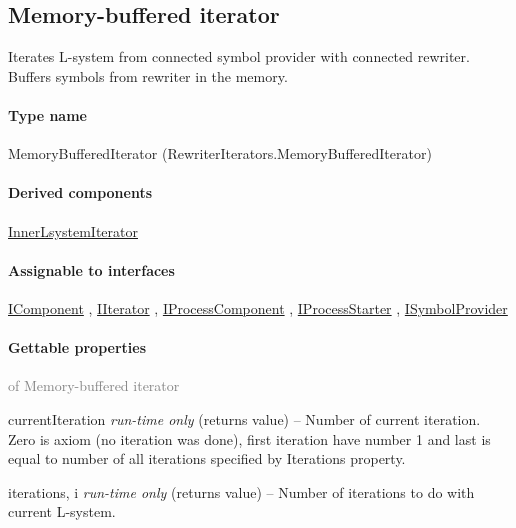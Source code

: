 

\subsection{Memory-buffered iterator}
\label{Malsys.Processing.Components.RewriterIterators.MemoryBufferedIterator}
Iterates L-system from connected symbol provider with connected rewriter.
            Buffers symbols from rewriter in the memory.\paragraph{Type name}
MemoryBufferedIterator (RewriterIterators.MemoryBufferedIterator) 	\paragraph{Derived components}
		\hyperref[Malsys.Processing.Components.RewriterIterators.InnerLsystemIterator]{InnerLsystemIterator}%
	\paragraph{Assignable to interfaces}
		\hyperref[Malsys.Processing.Components.IComponent]{IComponent}%
, 		\hyperref[Malsys.Processing.Components.IIterator]{IIterator}%
, 		\hyperref[Malsys.Processing.Components.IProcessComponent]{IProcessComponent}%
, 		\hyperref[Malsys.Processing.Components.IProcessStarter]{IProcessStarter}%
, 		\hyperref[Malsys.Processing.Components.ISymbolProvider]{ISymbolProvider}%
	\paragraph{Gettable properties}\textcolor{gray}{of Memory-buffered iterator}
	\begin{description*}
		\item[currentIteration]
 \textit{run-time only} 		(returns value)
			-- Number of current iteration. Zero is axiom (no iteration was done), first iteration have number 1
            and last is equal to number of all iterations specified by Iterations property.
		\item[iterations, i]
 \textit{run-time only} 		(returns value)
			-- Number of iterations to do with current L-system.
	\end{description*}
